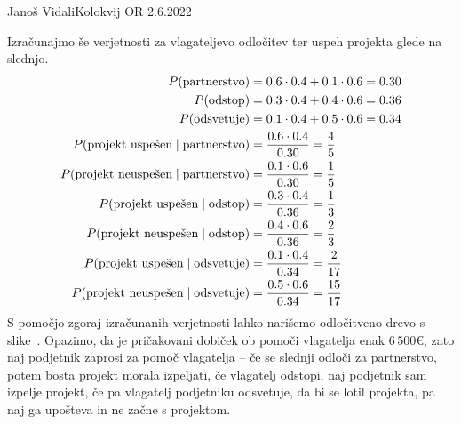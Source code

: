 \begin{naloga}{Janoš Vidali}{Kolokvij OR 2.6.2022}
\begin{odgovor}
Izračunajmo še verjetnosti za vlagateljevo odločitev
ter uspeh projekta glede na slednjo.
\begin{align*}
P(\text{partnerstvo}) &= 0.6 \cdot 0.4 + 0.1 \cdot 0.6 = 0.30 \\
P(\text{odstop}) &= 0.3 \cdot 0.4 + 0.4 \cdot 0.6 = 0.36 \\
P(\text{odsvetuje}) &= 0.1 \cdot 0.4 + 0.5 \cdot 0.6 = 0.34 \\
P(\text{projekt uspešen} \mid \text{partnerstvo})
&= {0.6 \cdot 0.4 \over 0.30} = {4 \over 5} \\
P(\text{projekt neuspešen} \mid \text{partnerstvo})
&= {0.1 \cdot 0.6 \over 0.30} = {1 \over 5} \\
P(\text{projekt uspešen} \mid \text{odstop})
&= {0.3 \cdot 0.4 \over 0.36} = {1 \over 3} \\
P(\text{projekt neuspešen} \mid \text{odstop})
&= {0.4 \cdot 0.6 \over 0.36} = {2 \over 3} \\
P(\text{projekt uspešen} \mid \text{odsvetuje})
&= {0.1 \cdot 0.4 \over 0.34} = {2 \over 17} \\
P(\text{projekt neuspešen} \mid \text{odsvetuje})
&= {0.5 \cdot 0.6 \over 0.34} = {15 \over 17}
\end{align*}
S pomočjo zgoraj izračunanih verjetnosti
lahko narišemo odločitveno drevo s slike~\fig.
Opazimo,
da je pričakovani dobiček ob pomoči vlagatelja enak $6\,500 €$,
zato naj podjetnik zaprosi za pomoč vlagatelja
-- če se slednji odloči za partnerstvo, potem bosta projekt morala izpeljati,
če vlagatelj odstopi, naj podjetnik sam izpelje projekt,
če pa vlagatelj podjetniku odsvetuje, da bi se lotil projekta,
pa naj ga upošteva in ne začne s projektom.

\begin{slika}
\makebox[\textwidth][c]{
\pgfslika
}
\end{slika}\end{odgovor}
\end{naloga}

